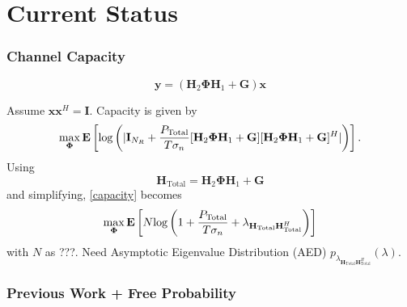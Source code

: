 \documentclass[10pt,tgadventor, onlymath]{beamer}
\begin{document}
\section{Current Status}


\begin{frame}
\frametitle{Channel Capacity}
\begin{equation*}
	\mathbf{y} = (\mathbf{H}_2\boldsymbol{\Phi}\mathbf{H}_1 + \mathbf{G})\mathbf{x}
\end{equation*}

Assume $\mathbf{x}\mathbf{x}^H = \mathbf{I}$. Capacity is given by 
\begin{equation}\label{capacity}
\underset{\boldsymbol{\Phi} }{\mathrm{max}}
\mathop{\bf E{}}\left[\text{log{}}\left(|\mathbf{I}_{N_R}+\frac{P_{\text{Total}}}{T \sigma_n}[\mathbf{H}_{2}\boldsymbol{\Phi}\mathbf{H}_{1} + \mathbf{G}][\mathbf{H}_{2}\boldsymbol{\Phi}\mathbf{H}_{1} + \mathbf{G}]^H|\right)\right].
\end{equation}
Using 
\begin{equation}
\mathbf{H}_{\text{Total}} = \mathbf{H}_{2}\boldsymbol{\Phi}\mathbf{H}_{1} + \mathbf{G}
\end{equation}
and simplifying, \ref{capacity} becomes
\begin{equation}
\underset{\boldsymbol{\Phi} }{\mathrm{max}}
\mathop{\bf E{}}\left[N\text{log{}}\left(1+\frac{P_{\text{Total}}}{T \sigma_n} + \lambda_{\mathbf{H}_{\text{Total}}\mathbf{H}_{\text{Total}}^H}\right)\right]
\end{equation}
with $N$ as ???.
Need Asymptotic Eigenvalue Distribution (AED) $p_{\lambda_{\mathbf{H}_{\text{Total}}\mathbf{H}_{\text{Total}}^H}}(\lambda)$.
\end{frame}


\subsubsection{Previous Work + Free Probability}
\end{document}
